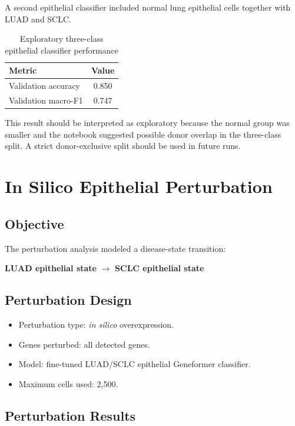 \documentclass[11pt,a4paper]{article}
\begin{document}
A second epithelial classifier included normal lung epithelial cells together with LUAD and SCLC.

\begin{table}[htbp]
\centering
\caption{Exploratory three-class epithelial classifier performance}
\begin{tabular}{lc}
\toprule
Metric & Value \\
\midrule
Validation accuracy & 0.850 \\
Validation macro-F1 & 0.747 \\
\bottomrule
\end{tabular}
\end{table}

This result should be interpreted as exploratory because the normal group was smaller and the notebook suggested possible donor overlap in the three-class split. A strict donor-exclusive split should be used in future runs.

\section{In Silico Epithelial Perturbation}

\subsection{Objective}

The perturbation analysis modeled a disease-state transition:

\begin{center}
\textbf{LUAD epithelial state} $\rightarrow$ \textbf{SCLC epithelial state}
\end{center}

\subsection{Perturbation Design}

\begin{itemize}[leftmargin=*]
    \item Perturbation type: \textit{in silico} overexpression.
    \item Genes perturbed: all detected genes.
    \item Model: fine-tuned LUAD/SCLC epithelial Geneformer classifier.
    \item Maximum cells used: 2,500.
\end{itemize}

\subsection{Perturbation Results}
\end{document}
